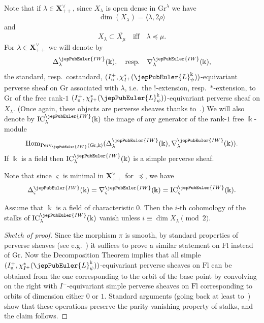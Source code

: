 Note that if $\lambda \in \boldsymbol{X}^\vee_{++}$, since $X_\lambda$ is open dense in $\mathrm{Gr}^\lambda$ we have
\begin{equation}
\label{jep104local007}
\dim(X_\lambda) = \langle \lambda, 2\rho \rangle
\end{equation}
and
\[
X_\lambda \subset \overline{X_\mu} \quad \text{iff} \quad \lambda \preccurlyeq \mu.
\]
For $\lambda \in \boldsymbol{X}^\vee_{++}$ we will denote by
\[
\Delta^{\jepPubEuler{IW}}_\lambda(\Bbbk), \quad \text{resp.} \quad \nabla^{\jepPubEuler{IW}}_\lambda(\Bbbk),
\]
the standard, resp.~costandard, $(I^+_\mathrm{u}, \chi_{I^+}^*(\jepPubEuler{L}^\Bbbk_\psi))$-equivariant perverse sheaf on $\mathrm{Gr}$ associated with $\lambda$, i.e.~the $!$-extension, resp.~$*$-extension, to $\mathrm{Gr}$ of the free rank-$1$ $(I^+_\mathrm{u}, \chi_{I^+}^*(\jepPubEuler{L}^\Bbbk_\psi))$-equivariant perverse sheaf on $X_\lambda$. (Once again, these objects are perverse sheaves thanks to~\cite[Cor.~4.1.3]{jep104ref12}.) We will also denote by $\mathrm{IC}_\lambda^{\jepPubEuler{IW}}(\Bbbk)$ the image of any generator of the rank-$1$ free $\Bbbk$-module
\[
\operatorname{Hom}_{\mathrm{Perv}_{\jepPubEuler{IW}}(\mathrm{Gr}, \Bbbk)}(\Delta_\lambda^{\jepPubEuler{IW}}(\Bbbk), \nabla_\lambda^{\jepPubEuler{IW}}(\Bbbk)).
\]
If $\Bbbk$ is a field then $\mathrm{IC}_\lambda^{\jepPubEuler{IW}}(\Bbbk)$ is a simple perverse sheaf.

Note that since $\varsigma$ is minimal in $\boldsymbol{X}^\vee_{++}$ for $\preccurlyeq$, we have
\begin{equation}
\label{jep104local003}
\Delta^{\jepPubEuler{IW}}_{\varsigma}(\Bbbk) = \nabla^{\jepPubEuler{IW}}_\varsigma(\Bbbk) = \mathrm{IC}^{\jepPubEuler{IW}}_\varsigma(\Bbbk).
\end{equation}

\begin{lem}
\label{jep104local021}
Assume that $\Bbbk$ is a field of characteristic $0$. Then the $i$-th cohomology of the stalks of $\mathrm{IC}^{\jepPubEuler{IW}}_\lambda(\Bbbk)$ vanish unless $i \equiv \dim X_\lambda \pmod 2$.
\end{lem}

\begin{proof}[Sketch of proof]
Since the morphism $\pi$ is smooth, by standard properties of perverse sheaves (see e.g.~\cite[\S 4.2.6]{jep104ref12}) it suffices to prove a similar statement on $\mathrm{Fl}$ instead of $\mathrm{Gr}$. Now the Decomposition Theorem implies that all simple $(I_\mathrm{u}^+, \chi_{I^+}^*(\jepPubEuler{L}^\Bbbk_\psi))$-equivariant perverse sheaves on $\mathrm{Fl}$ can be obtained from the one corresponding to the orbit of the base point by convolving on the right with $I^-$-equivariant simple perverse sheaves on $\mathrm{Fl}$ corresponding to orbits of dimension either $0$ or $1$. Standard arguments (going back at least to~\cite{jep104ref43}) show that these operations preserve the parity-vanishing property of stalks, and the claim follows.
\end{proof}

